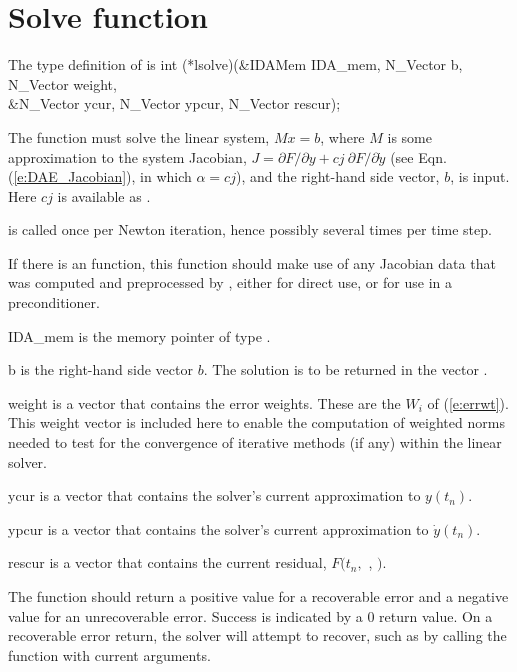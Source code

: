 
\section{Solve function}
The type definition of  is
{
  int (*lsolve)(&IDAMem IDA\_mem, N\_Vector b, N\_Vector weight, \\
                &N\_Vector ycur, N\_Vector ypcur, N\_Vector rescur);  
}
{
  The  function must solve the linear system, $M x = b$, where         
  $M$ is some approximation to the system Jacobian,
  $J = \partial F / \partial y + cj ~ \partial F / \partial \dot{y}$  
  (see Eqn. (\ref{e:DAE_Jacobian}), in which $\alpha = cj$),
  and the right-hand side vector, $b$, is input. 
  Here $cj$ is available as .

   is called once per Newton iteration, hence possibly
  several times per time step.

  If there is an  function, this  function should
  make use of any Jacobian data that was computed and preprocessed
  by , either for direct use, or for use in a preconditioner.
}
{
  \begin{args}
  \item[IDA\_mem]
    is the {\idas} memory pointer of type .
  \item[b]
    is the right-hand side vector $b$. The solution is to be    
    returned in the vector .
  \item[weight]
    is a vector that contains the error weights.
    These are the $W_i$ of (\ref{e:errwt}).
    This weight vector is included here to enable the computation of
    weighted norms needed to test for the convergence of iterative methods
    (if any) within the linear solver.
  \item[ycur]
    is a vector that contains the solver's current approximation to $y(t_n)$.
  \item[ypcur]
    is a vector that contains the solver's current approximation to $\dot{y}(t_n)$.
  \item[rescur]
    is a vector that contains the current residual, $F(t_n,$ , $)$.
  \end{args}
}
{
  The  function should return a positive value    
  for a recoverable error and a negative value for an             
  unrecoverable error. Success is indicated by a 0 return value.
  On a recoverable error return, the solver will attempt to recover, such
  as by calling the  function with current arguments.
}
{}

